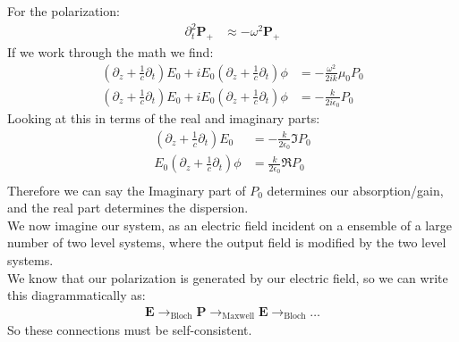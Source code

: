 For the polarization:
\begin{align*}
	\partial_t^2\bm{P}_+ &\approx -\omega^2\bm{P}_+
\end{align*}
If we work through the math we find:
\begin{align*}
	\left(\partial_z + \frac{1}{c}\partial_t\right)E_0 + iE_0\left(\partial_z + \frac{1}{c}\partial_t\right)\phi &= -\frac{\omega^2}{2ik}\mu_0P_0 \\
	\left(\partial_z + \frac{1}{c}\partial_t\right)E_0 + iE_0\left(\partial_z + \frac{1}{c}\partial_t\right)\phi &= -\frac{k}{2i\epsilon_0}P_0
\end{align*}
Looking at this in terms of the real and imaginary parts:
\begin{align*}
	\left(\partial_z + \frac{1}{c}\partial_t\right)E_0 &= -\frac{k}{2\epsilon_0} \Im P_0 \\
	E_0\left(\partial_z + \frac{1}{c}\partial_t\right)\phi &= \frac{k}{2\epsilon_0} \Re P_0 \\
\end{align*}
Therefore we can say the Imaginary part of $P_0$ determines our absorption/gain, and the real part determines the dispersion.\\
We now imagine our system, as an electric field incident on a ensemble of a large number of two level systems, where the output field is modified by the two level systems. \\
We know that our polarization is generated by our electric field, so we can write this diagrammatically as:
\begin{align*}
	\bm{E} \to_{\text{Bloch}} \bm{P} \to_{\text{Maxwell}} \bm{E} \to_\text{Bloch} \ldots
\end{align*}
So these connections must be self-consistent. \\
